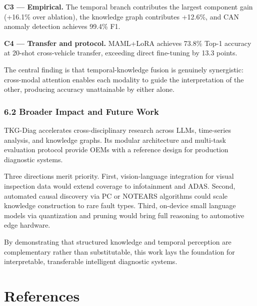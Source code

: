 \documentclass[
  11pt,
]{article}
\begin{document}
\textbf{C3 --- Empirical.} The temporal branch contributes the largest
component gain (+16.1\% over ablation), the knowledge graph contributes
+12.6\%, and CAN anomaly detection achieves 99.4\% F1.

\textbf{C4 --- Transfer and protocol.} MAML+LoRA achieves 73.8\% Top-1
accuracy at 20-shot cross-vehicle transfer, exceeding direct fine-tuning
by 13.3 points.

The central finding is that temporal-knowledge fusion is genuinely
synergistic: cross-modal attention enables each modality to guide the
interpretation of the other, producing accuracy unattainable by either
alone.

\subsubsection{6.2 Broader Impact and Future
Work}\label{broader-impact-and-future-work}

TKG-Diag accelerates cross-disciplinary research across LLMs,
time-series analysis, and knowledge graphs. Its modular architecture and
multi-task evaluation protocol provide OEMs with a reference design for
production diagnostic systems.

Three directions merit priority. First, vision-language integration for
visual inspection data would extend coverage to infotainment and ADAS.
Second, automated causal discovery via PC or NOTEARS algorithms could
scale knowledge construction to rare fault types. Third, on-device small
language models via quantization and pruning would bring full reasoning
to automotive edge hardware.

By demonstrating that structured knowledge and temporal perception are
complementary rather than substitutable, this work lays the foundation
for interpretable, transferable intelligent diagnostic systems.

\newpage

\section{References}\label{references}
\end{document}
